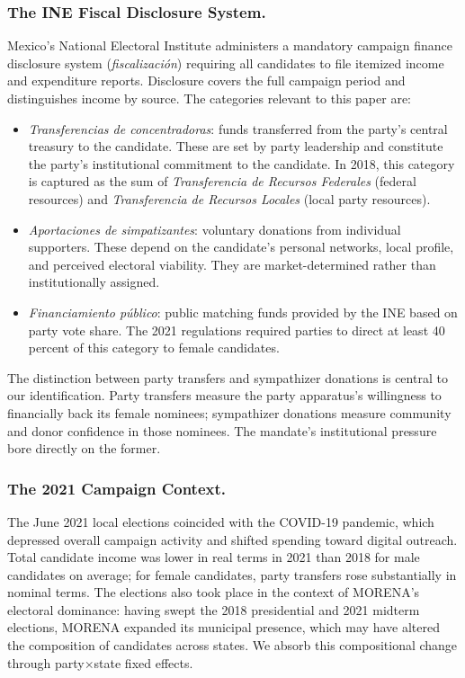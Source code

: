 \documentclass[12pt]{article}
\begin{document}
\subsubsection*{The INE Fiscal Disclosure System.}
Mexico's National Electoral Institute administers a mandatory campaign finance disclosure system (\textit{fiscalizaci\'on}) requiring all candidates to file itemized income and expenditure reports. Disclosure covers the full campaign period and distinguishes income by source. The categories relevant to this paper are:

\begin{itemize}
  \item \textit{Transferencias de concentradoras}: funds transferred from the party's central treasury to the candidate. These are set by party leadership and constitute the party's institutional commitment to the candidate. In 2018, this category is captured as the sum of \textit{Transferencia de Recursos Federales} (federal resources) and \textit{Transferencia de Recursos Locales} (local party resources).
  \item \textit{Aportaciones de simpatizantes}: voluntary donations from individual supporters. These depend on the candidate's personal networks, local profile, and perceived electoral viability. They are market-determined rather than institutionally assigned.
  \item \textit{Financiamiento p\'ublico}: public matching funds provided by the INE based on party vote share. The 2021 regulations required parties to direct at least 40 percent of this category to female candidates.
\end{itemize}

The distinction between party transfers and sympathizer donations is central to our identification. Party transfers measure the party apparatus's willingness to financially back its female nominees; sympathizer donations measure community and donor confidence in those nominees. The mandate's institutional pressure bore directly on the former.

\subsubsection*{The 2021 Campaign Context.}
The June 2021 local elections coincided with the COVID-19 pandemic, which depressed overall campaign activity and shifted spending toward digital outreach. Total candidate income was lower in real terms in 2021 than 2018 for male candidates on average; for female candidates, party transfers rose substantially in nominal terms. The elections also took place in the context of MORENA's electoral dominance: having swept the 2018 presidential and 2021 midterm elections, MORENA expanded its municipal presence, which may have altered the composition of candidates across states. We absorb this compositional change through party$\times$state fixed effects.
\end{document}
